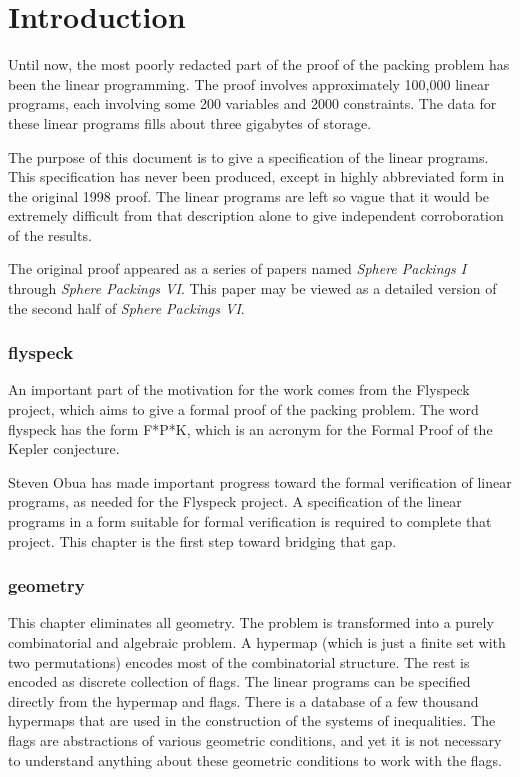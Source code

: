 


\section{Introduction}

Until now, the most poorly redacted part of the proof of the
packing problem has been the linear programming.  The proof
involves approximately 100,000 linear programs, each involving
some 200 variables and 2000 constraints.  The data for these
linear programs fills about three gigabytes of storage.

The purpose of this document is to give a specification of the
linear programs. This specification has never been produced,
except in highly abbreviated form in the original 1998 proof. The
linear programs are left so vague that it would be extremely
difficult from that description alone to give independent
corroboration of the results.

The original proof appeared as a series of papers named {\it
Sphere Packings I} through {\it Sphere Packings VI}.  This paper
may be viewed as a detailed version of the second half of 
{\it Sphere Packings VI}.

\subsubsection{flyspeck}

An important part of the motivation for the work comes from the
Flyspeck project, which aims to give a formal proof of the packing
problem.  The word flyspeck has the form F*P*K, which is an
acronym for the Formal Proof of the Kepler conjecture.

Steven Obua has made important progress toward the formal
verification of linear programs, as needed for the Flyspeck
project.  A specification
of the linear programs in a form suitable for formal verification
is required to complete that project.
This chapter is the first step toward bridging that gap.

\subsubsection{geometry}

This chapter eliminates all geometry.  The problem is transformed
into a purely combinatorial and algebraic problem.
A hypermap (which is just a finite set
with two permutations) encodes most of the combinatorial
structure.  The rest is encoded as discrete collection of flags.
The linear programs can be specified directly from the hypermap
and flags.  There is a database of a few thousand hypermaps that
are used in the construction of the systems of inequalities.  The
flags are abstractions of various geometric conditions, and yet
it is not necessary to understand anything about these geometric
conditions to work with the flags.

